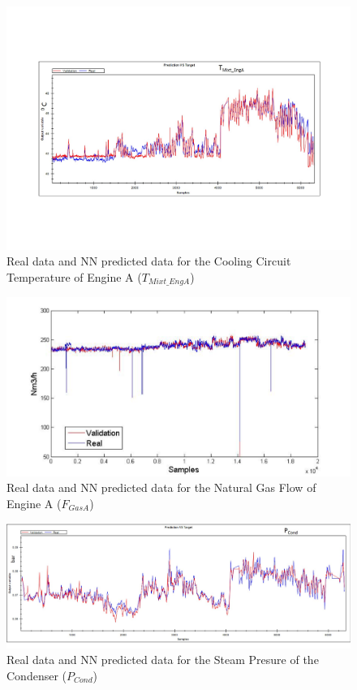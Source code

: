 \begin{figure}
\centering
\includegraphics[width=1\textwidth]{IrrigationA-ANN.pdf}
\caption{Real data and NN predicted data for the Cooling Circuit Temperature of Engine A ($T_{Mixt\_EngA}$)}
\label{TcoolA}
\end{figure}

\begin{figure}
\centering
\includegraphics[width=1\textwidth]{ANNengineD.pdf}
\caption{Real data and NN predicted data for the Natural Gas Flow  of Engine A ($F_{GasA}$) }
\label{FengineA}
\end{figure}

\begin{figure}
\centering
\includegraphics[width=1\textwidth]{ANN-STcond.pdf}
\caption{Real data and NN predicted data for the Steam Presure of the Condenser  ($P_{Cond}$) }
\label{Pcond}
\end{figure}

